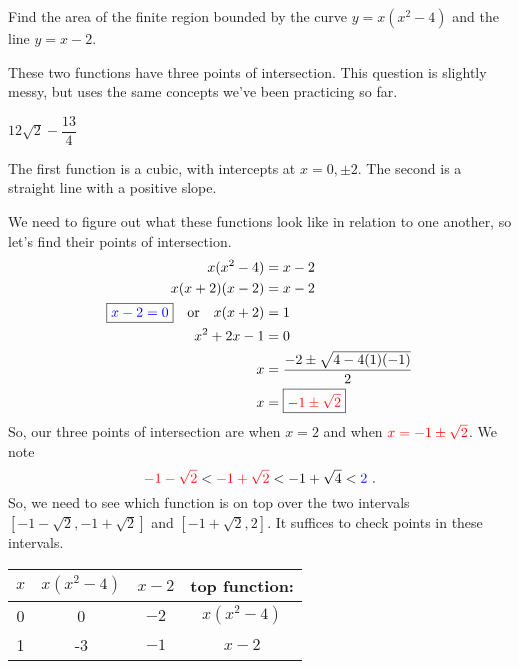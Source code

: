 

\begin{Mquestion}
Find the area of the finite region bounded by the curve $y=x(x^2-4)$ and the line $y=x-2$.
\end{Mquestion}
\begin{hint}
These two functions have three points of intersection. This question is slightly messy, but uses the same concepts we've been practicing so far.
\end{hint}
\begin{answer}
$12\sqrt{2}-\dfrac{13}{4}$
\end{answer}
\begin{solution}
The first function is a cubic, with intercepts at $x=0,\pm2$. The second is a straight line  with a positive slope.

We need to figure out what these functions look like in relation to one another, so let's find their points of intersection.
\begin{align*}
x(x^2-4)&=x-2\\
x(x+2)(x-2)&=x-2\\
\boxed{\color{blue}x-2=0} \quad\mbox{or}\quad x(x+2)&=1\\
x^2+2x-1&=0\\
x &= \dfrac{-2\pm\sqrt{4-4(1)(-1)}}{2}\\
x&=\boxed{\color{red}-1\pm \sqrt{2}}
\end{align*}
So, our three points of intersection are when {\color{blue}$x=2$} and when ${\color{red}x=-1\pm\sqrt{2}}$. We note \[\textcolor{red}{-1-\sqrt{2}} <\textcolor{red}{ -1+\sqrt{2} }< -1+\sqrt{4}<\textcolor{blue}{2}\ .\] So, we need to see which function is on top over the two intervals $\left[-1-\sqrt{2},-1+\sqrt{2}\right]$ and $\left[-1+\sqrt{2},2\right]$. It suffices to check points in these intervals.

\begin{center}
\begin{tabular}{|c|c|c|c|}
\hline
$x$&$x(x^2-4)$ & $x-2$ & top function:\\
\hline
0 & 0 & $-2$ & $x(x^2-4)$\\
\hline
1 & -3 & $-1$ & $x-2$\\
\hline
\end{tabular}
\end{center}



\end{solution}

